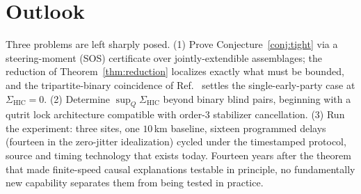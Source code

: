 \documentclass[10pt,twocolumn]{article}
\newcommand{\Sig}{\Sigma_{\mathrm{HIC}}}
\begin{document}
\section{Outlook}

Three problems are left sharply posed. (1) Prove Conjecture~\ref{conj:tight} via a steering-moment (SOS) certificate over jointly-extendible assemblages; the reduction of Theorem~\ref{thm:reduction} localizes exactly what must be bounded, and the tripartite-binary coincidence of Ref.~\cite{Barnea2013} settles the single-early-party case at $\Sig=0$. (2) Determine $\sup_Q\Sig$ beyond binary blind pairs, beginning with a qutrit lock architecture compatible with order-$3$ stabilizer cancellation. (3) Run the experiment: three sites, one $10$\,km baseline, sixteen programmed delays (fourteen in the zero-jitter idealization) cycled under the timestamped protocol, source and timing technology that exists today. Fourteen years after the theorem that made finite-speed causal explanations testable in principle, no fundamentally new capability separates them from being tested in practice.
\end{document}
